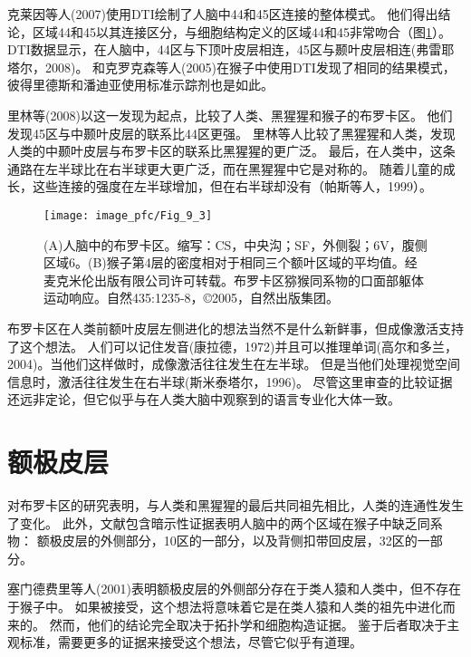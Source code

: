 克莱因等人(2007)使用DTI绘制了人脑中44和45区连接的整体模式。
他们得出结论，区域44和45以其连接区分，与细胞结构定义的区域44和45非常吻合（图\ref{fig:fig_9_3}）。
DTI数据显示，在人脑中，44区与下顶叶皮层相连，45区与颞叶皮层相连(弗雷耶塔尔，2008)。
和克罗克森等人(2005)在猴子中使用DTI发现了相同的结果模式，彼得里德斯和潘迪亚使用标准示踪剂也是如此。
\par


里林等(2008)以这一发现为起点，比较了人类、黑猩猩和猴子的布罗卡区。
他们发现45区与中颞叶皮层的联系比44区更强。
里林等人比较了黑猩猩和人类，发现人类的中颞叶皮层与布罗卡区的联系比黑猩猩的更广泛。
最后，在人类中，这条通路在左半球比在右半球更大更广泛，而在黑猩猩中它是对称的。
随着儿童的成长，这些连接的强度在左半球增加，但在右半球却没有（帕斯等人，1999）。
\par


\begin{figure}[!htb]
	\centering
	\texttt{[image: image\_pfc/Fig\_9\_3]}
	\caption{(A)人脑中的布罗卡区。缩写：CS，中央沟；SF，外侧裂；6V，腹侧区域6。(B)猴子第4层的密度相对于相同三个额叶区域的平均值。经麦克米伦出版有限公司许可转载。布罗卡区猕猴同系物的口面部躯体运动响应。自然435:1235-8，©2005，自然出版集团。\label{fig:fig_9_3}}
\end{figure}

\par

布罗卡区在人类前额叶皮层左侧进化的想法当然不是什么新鲜事，但成像激活支持了这个想法。
人们可以记住发音(康拉德，1972)并且可以推理单词(高尔和多兰，2004)。当他们这样做时，成像激活往往发生在左半球。
但是当他们处理视觉空间信息时，激活往往发生在右半球(斯米泰塔尔，1996)。
尽管这里审查的比较证据还远非定论，但它似乎与在人类大脑中观察到的语言专业化大体一致。



\section{额极皮层}
对布罗卡区的研究表明，与人类和黑猩猩的最后共同祖先相比，人类的连通性发生了变化。
此外，文献包含暗示性证据表明人脑中的两个区域在猴子中缺乏同系物：
额极皮层的外侧部分，10区的一部分，以及背侧扣带回皮层，32区的一部分。
\par


塞门德费里等人(2001)表明额极皮层的外侧部分存在于类人猿和人类中，但不存在于猴子中。
如果被接受，这个想法将意味着它是在类人猿和人类的祖先中进化而来的。
然而，他们的结论完全取决于拓扑学和细胞构造证据。
鉴于后者取决于主观标准，需要更多的证据来接受这个想法，尽管它似乎有道理。
\par


